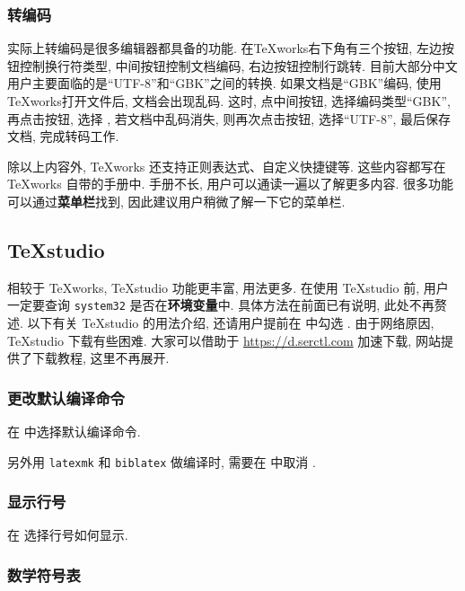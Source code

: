 \subsubsection{转编码}

实际上转编码是很多编辑器都具备的功能. 
在\TeX works右下角有三个按钮,
左边按钮控制换行符类型, 中间按钮控制文档编码, 右边按钮控制行跳转. 
目前大部分中文用户主要面临的是``UTF-8''和``GBK''之间的转换. 
如果文档是``GBK''编码, 使用\TeX works打开文件后, 文档会出现乱码. 
这时, 点中间按钮, 选择编码类型``GBK'', 再点击按钮,
选择 , 若文档中乱码消失, 则再次点击按钮,
选择``UTF-8'', 最后保存文档, 完成转码工作. 

除以上内容外, \TeX works 还支持正则表达式、自定义快捷键等. 
这些内容都写在 \TeX works 自带的手册中. 
手册不长, 用户可以通读一遍以了解更多内容.
很多功能可以通过\textbf{菜单栏}找到,
因此建议用户稍微了解一下它的菜单栏.

\subsection{\TeX studio}

相较于 \TeX works, \TeX studio 功能更丰富, 用法更多.
在使用 \TeX studio 前,
用户一定要查询 \texttt{system32} 是否在\textbf{环境变量}中.
具体方法在前面已有说明, 此处不再赘述.
以下有关 \TeX studio 的用法介绍,
还请用户提前在  中勾选
.
由于网络原因,
\TeX studio 下载有些困难.
大家可以借助于
\url{https://d.serctl.com}
加速下载,
网站提供了下载教程,
这里不再展开.

\subsubsection{更改默认编译命令}

在 
中选择默认编译命令. 

另外用 \texttt{latexmk} 和 \texttt{biblatex} 做编译时,
需要在 
中取消 . 

\subsubsection{显示行号}

在  选择行号如何显示.

\subsubsection{数学符号表}

